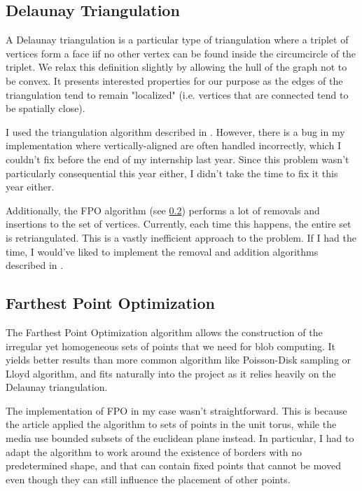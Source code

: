 \documentclass{article}
\begin{document}
\subsection{Delaunay Triangulation}

A Delaunay triangulation is a particular type of triangulation where a triplet of vertices form a face iif no other vertex can be found inside the circumcircle of the triplet. We relax this definition slightly by allowing the hull of the graph not to be convex. It presents interested properties for our purpose as the edges of the triangulation tend to remain "localized" (i.e. vertices that are connected tend to be spatially close).

I used the triangulation algorithm described in \cite{build_delaunay}. However, there is a bug in my implementation where vertically-aligned are often handled incorrectly, which I couldn't fix before the end of my internship last year. Since this problem wasn't particularly consequential this year either, I didn't take the time to fix it this year either.

Additionally, the FPO algorithm (see \ref{fpo}) performs a lot of removals and insertions to the set of vertices. Currently, each time this happens, the entire set is retriangulated. This is a vastly inefficient approach to the problem. If I had the time, I would've liked to implement the removal and addition algorithms described in \cite{build_delaunay, remove_delaunay}.

\subsection{Farthest Point Optimization}
\label{fpo}

The Farthest Point Optimization algorithm \supercite{FPO} allows the construction of the irregular yet homogeneous sets of points that we need for blob computing. It yields better results than more common algorithm like Poisson-Disk sampling or Lloyd algorithm, and fits naturally into the project as it relies heavily on the Delaunay triangulation.

The implementation of FPO in my case wasn't straightforward. This is because the article applied the algorithm to sets of points in the unit torus, while the media use bounded subsets of the euclidean plane instead. In particular, I had to adapt the algorithm to work around the existence of borders with no predetermined shape, and that can contain fixed points that cannot be moved even though they can still influence the placement of other points.
\end{document}
